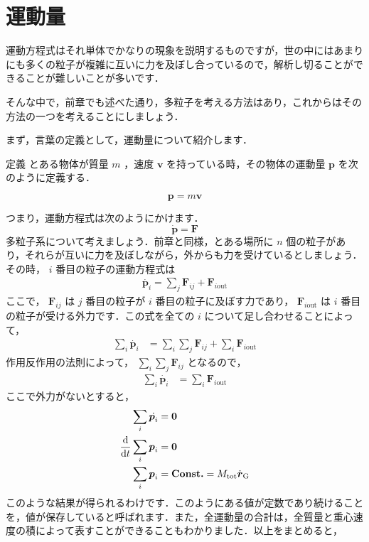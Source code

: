 \documentclass[
  b4paperpaper,
  xelatex,ja=standard]{bxjsbook}
\begin{document}
\hypertarget{ux904bux52d5ux91cf}{%
\section{運動量}\label{ux904bux52d5ux91cf}}

運動方程式はそれ単体でかなりの現象を説明するものですが，世の中にはあまりにも多くの粒子が複雑に互いに力を及ぼし合っているので，解析し切ることができることが難しいことが多いです．

そんな中で，前章でも述べた通り，多粒子を考える方法はあり，これからはその方法の一つを考えることにしましょう．

まず，言葉の定義として，運動量について紹介します．

\begin{Dbox}{定義}
とある物体が質量 \(m\) ，速度 \(\boldsymbol{v}\)
を持っている時，その物体の運動量 \(\boldsymbol{p}\)
を次のように定義する．

\[\boldsymbol{p}=m\boldsymbol{v}\]

\end{Dbox}

つまり，運動方程式は次のようにかけます．
\[\dot{\boldsymbol{p}}=\boldsymbol{F}\]
多粒子系について考えましょう．前章と同様，とある場所に \(n\)
個の粒子があり，それらが互いに力を及ぼしながら，外からも力を受けているとしましょう．その時，
\(i\) 番目の粒子の運動方程式は \begin{align*}
\dot{\boldsymbol{p}_i} = \sum_j \boldsymbol{F}_{ij} +  \boldsymbol{F}_{i\text{out}}
\end{align*} ここで， \(\boldsymbol{F}_{ij}\) は \(j\) 番目の粒子が
\(i\) 番目の粒子に及ぼす力であり， \(\boldsymbol{F}_{i\text{out}}\) は
\(i\) 番目の粒子が受ける外力です．この式を全ての \(i\)
について足し合わせることによって， \begin{align*}
\sum_i \dot{\boldsymbol{p}_i} &= \sum_i\sum_j \boldsymbol{F}_{ij} +  \sum_i\boldsymbol{F}_{i\text{out}}
\end{align*} 作用反作用の法則によって，
\(\sum_i\sum_j \boldsymbol{F}_{ij}\) となるので， \begin{align*}
\sum_i \dot{\boldsymbol{p}_i} &= \sum_i\boldsymbol{F}_{i\text{out}}
\end{align*} ここで外力がないとすると， \begin{align*}
\sum_i \dot{\boldsymbol{p}_i} &= \boldsymbol{0}\\
\dv{t}\sum_i \boldsymbol{p}_i &= \boldsymbol{0}\\
\sum_i \boldsymbol{p}_i &= \textbf{Const.}=M_{\text{tot}}\dot{\boldsymbol{r}}_{\text{G}}
\end{align*}
このような結果が得られるわけです．このようにある値が定数であり続けることを，値が保存していると呼ばれます．また，全運動量の合計は，全質量と重心速度の積によって表すことができることもわかりました．以上をまとめると，
\end{document}

